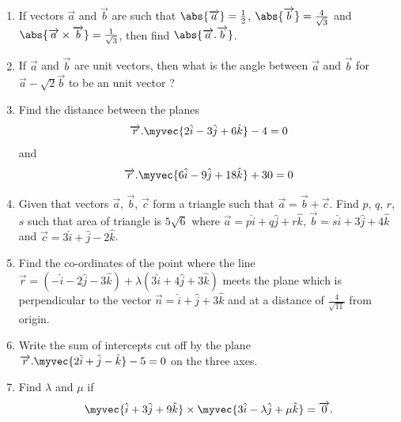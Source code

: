 \begin{enumerate}
	\item If vectors $\overrightarrow{a}$ and $\overrightarrow{b}$ are such that
	      $\abs{\overrightarrow{a}} = \frac{1}{2}$, $\abs{\overrightarrow{b}} = \frac{4}{\sqrt{3}}$
	      and $\abs{\overrightarrow{a} \times \overrightarrow{b}} = \frac{1}{\sqrt{3}}$, then find
	      $\abs{\overrightarrow{a}.\overrightarrow{b}}$.

	\item If $\overrightarrow{a}$ and $\overrightarrow{b}$ are unit vectors, then what is the angle between
	      $\overrightarrow{a}$ and $\overrightarrow{b}$ for $\overrightarrow{a} - \sqrt{2}\overrightarrow{b}$ to be an unit vector ?

	\item Find the distance between the planes
	      \begin{align*}
		      \overrightarrow{r}.\myvec{2\hat{i}-3\hat{j}+6\hat{k} } - 4 =0
	      \end{align*}
	      and
	      \begin{align*}
		      \overrightarrow{r}.\myvec{6\hat{i}-9\hat{j} +18\hat{k}} +30 =0
	      \end{align*}

	\item Given that vectors $\overrightarrow{a}$, $\overrightarrow{b}$, $\overrightarrow{c}$ form a triangle such that
	      $\overrightarrow{a} = \overrightarrow{b}+\overrightarrow{c}$. Find $p$, $q$, $r$, $s$ such that area of triangle is $5\sqrt{6}$ where $\overrightarrow{a} = p\hat{i} +q\hat{j}+r\hat{k}$,
	      $\overrightarrow{b} = s\hat{i} +3\hat{j}+4\hat{k}$ and $\overrightarrow{c}=3\hat{i} +\hat{j}-2\hat{k}$.

	\item Find the co-ordinates of the point where the line $\overrightarrow{r}=(-\hat{i}-2\hat{j}-3\hat{k})+\lambda(3\hat{i} +4\hat{j}+3\hat{k})$ meets the plane which is perpendicular to the vector $\overrightarrow{n}=\hat{i}+\hat{j} +3\hat{k}$ and at a distance of
	      $\frac{4}{\sqrt{11}}$ from origin.


	\item Write the sum of intercepts cut off by the plane $\overrightarrow{r}.\myvec{2\hat{i}+\hat{j}-\hat{k}} - 5 = 0$ on the three axes.

	\item Find $\lambda$ and $\mu$ if
	      \begin{align*}
		      \myvec{\hat{i} + 3\hat{j} + 9\hat{k}} \times \myvec{3\hat{i} - \lambda \hat{j} + \mu \hat{k}} = \overrightarrow{0}.
	      \end{align*}


\end{enumerate}
